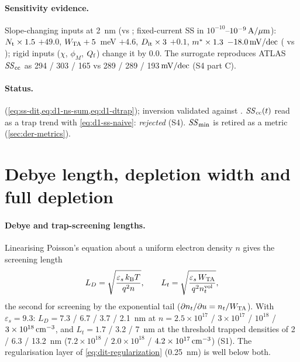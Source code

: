 \paragraph{Sensitivity evidence.}
Slope-changing inputs at 2~nm (vs ; fixed-current SS in $10^{-10}$--$10^{-9}\,\mathrm{A}/\mu\mathrm{m}$): $N_{\mathrm{t}}\times1.5$ $+49.0$,
$W_{\mathrm{TA}}+5$~meV $+4.6$, $D_{\mathrm{it}}\times3$ $+0.1$, $m^{*}\times1.3$ $-18.0\,\mathrm{mV/dec}$ ( vs ); rigid inputs
($\chi$, $\phi_M$, $Q_{\mathrm{f}}$) change it by $0.0$. The surrogate reproduces ATLAS $\mathit{SS}_{\mathrm{cc}}$ as 294 / 303 / 165 vs
289 / 289 / 193$\,\mathrm{mV/dec}$ (S4 part C).

\paragraph{Status.}
\evTHEORY{} (\cref{eq:ss-dit,eq:d1-ns-sum,eq:d1-dtrap}); inversion \evSURR{} validated against \evNUM. $\mathit{SS}_{\mathrm{cc}}(t)$ read as a trap
trend with \cref{eq:d1-ss-naive}: \emph{rejected} (S4). $\mathit{SS}_{\min}$ is retired as a metric (\cref{sec:der-metrics}).

\section{Debye length, depletion width and full depletion}
\label{sec:der-depletion}

\paragraph{Debye and trap-screening lengths.}
Linearising Poisson's equation about a uniform electron density $n$ gives the screening length
\begin{equation}
  L_D = \sqrt{\frac{\varepsilon_s\,k_{\mathrm{B}}T}{q^{2}n}},\qquad
  L_t = \sqrt{\frac{\varepsilon_s\,W_{\mathrm{TA}}}{q^{2}n_t^{\mathrm{vol}}}},
  \label{eq:d1-debye}
\end{equation}
the second for screening by the exponential tail ($\partial n_t/\partial u = n_t/W_{\mathrm{TA}}$). With $\varepsilon_s = 9.3$:
$L_D = 7.3$ / 6.7 / 3.7 / 2.1~nm at $n = 2.5\times10^{17}$ / $3\times10^{17}$ / $10^{18}$ / $3\times10^{18}\,\mathrm{cm}^{-3}$, and
$L_t = 1.7$ / 3.2 / 7~nm at the threshold trapped densities of 2 / 6.3 / 13.2~nm ($7.2\times10^{18}$ / $2.0\times10^{18}$ /
$4.2\times10^{17}\,\mathrm{cm}^{-3}$) (S1). The regularisation layer of \cref{eq:dit-regularization} (0.25~nm) is well below both.

